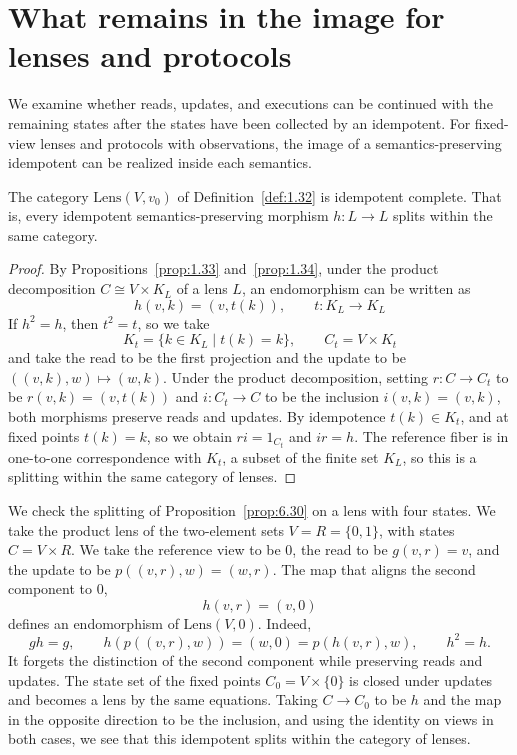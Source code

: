 \section{What remains in the image for lenses and protocols}\label{sec:6.8}

We examine whether reads, updates, and executions can be continued with the remaining
states after the states have been collected by an idempotent.
For fixed-view lenses and protocols with observations, the image of a semantics-preserving
idempotent can be realized inside each semantics.

\begin{proposition}\label{prop:6.30}

The category $\mathrm{Lens}(V,v_0)$ of Definition~\ref{def:1.32} is idempotent complete.
That is, every idempotent semantics-preserving morphism $h:L\to L$ splits within the same
category.

\end{proposition}

\begin{proof}

By Propositions~\ref{prop:1.33} and~\ref{prop:1.34}, under the product decomposition
$C\cong V\times K_L$ of a lens $L$, an endomorphism can be written as
\[
h(v,k)=(v,t(k)),\qquad t:K_L\to K_L
\]
If $h^2=h$, then $t^2=t$, so we take
\[
K_t=\{k\in K_L\mid t(k)=k\},\qquad C_t=V\times K_t
\]
and take the read to be the first projection and the update to be
$((v,k),w)\mapsto(w,k)$.
Under the product decomposition, setting $r:C\to C_t$ to be $r(v,k)=(v,t(k))$ and
$i:C_t\to C$ to be the inclusion $i(v,k)=(v,k)$, both morphisms preserve reads and updates.
By idempotence $t(k)\in K_t$, and at fixed points $t(k)=k$, so we obtain
$ri=1_{C_t}$ and $ir=h$.
The reference fiber is in one-to-one correspondence with $K_t$, a subset of the finite set
$K_L$, so this is a splitting within the same category of lenses.

\end{proof}

We check the splitting of Proposition~\ref{prop:6.30} on a lens with four states.
We take the product lens of the two-element sets $V=R=\{0,1\}$, with states $C=V\times R$.
We take the reference view to be 0, the read to be $g(v,r)=v$, and the update to be
$p((v,r),w)=(w,r)$.
The map that aligns the second component to 0,
\begin{equation*}
h(v,r)=(v,0)
\tag{6.44}\label{eq:6.44}
\end{equation*}
defines an endomorphism of $\mathrm{Lens}(V,0)$. Indeed,
\begin{equation*}
gh=g,\qquad
h(p((v,r),w))=(w,0)=p(h(v,r),w),\qquad h^2=h.
\tag{6.45}\label{eq:6.45}
\end{equation*}
It forgets the distinction of the second component while preserving reads and updates.
The state set of the fixed points $C_0=V\times\{0\}$ is closed under updates and becomes a
lens by the same equations.
Taking $C\to C_0$ to be $h$ and the map in the opposite direction to be the inclusion, and
using the identity on views in both cases, we see that this idempotent splits within the
category of
lenses.

